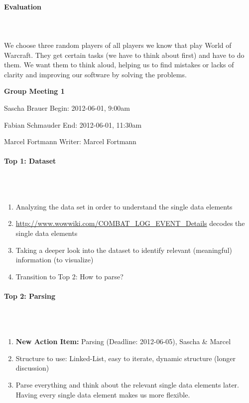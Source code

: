 \documentclass{scrartcl}
\begin{document}
\paragraph{Evaluation}
\hfill \\ \hfill \\
We choose three random players of all players we know that play World of Warcraft. They get certain tasks (we have to think about first) and have to do them. We want them to think aloud, helping us to find mistakes or lacks of clarity and improving our software by solving the problems.

\clearpage

\begin{center}
{\huge \textbf{Group Meeting 1}}\\
\end{center}
\begin{description}
\item Sascha Brauer \hfill Begin: 2012-06-01, 9:00am 
\item Fabian Schmauder \hfill End: 2012-06-01, 11:30am
\item Marcel Fortmann \hfill Writer: Marcel Fortmann
\end{description}

\paragraph{Top 1: Dataset}
\hfill \\ \hfill \\
\begin {enumerate}
\item Analyzing the data set in order to understand the single data elements
\item \url{http://www.wowwiki.com/COMBAT_LOG_EVENT_Details} decodes the single data elements
\item Taking a deeper look into the dataset to identify relevant (meaningful) information (to visualize)
\item Transition to Top 2: How to parse?
\end {enumerate}

\paragraph{Top 2: Parsing}
\hfill \\ \hfill \\
\begin {enumerate}
\item \textbf{New Action Item:} Parsing (Deadline: 2012-06-05), Sascha \& Marcel
\item Structure to use: Linked-List, easy to iterate, dynamic structure (longer discussion)
\item Parse everything and think about the relevant single data elements later. Having every single data element makes us more flexible.
\end {enumerate}
\end{document}
